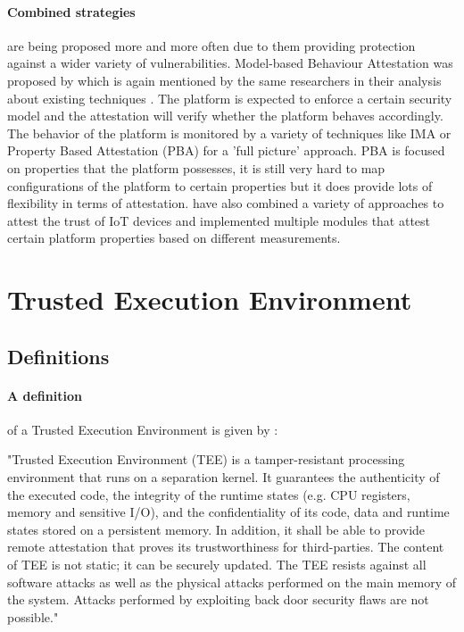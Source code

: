 \paragraph*{Combined strategies}
are being proposed more and more often due to them providing protection against a wider variety of vulnerabilities. Model-based Behaviour Attestation was proposed by \cite{AlamMasoom2008Mba} which is again mentioned by the same researchers in their analysis about existing techniques \cite{AlamMasoom2012Aoer}. The platform is expected to enforce a certain security model and the attestation will verify whether the platform behaves accordingly. The behavior of the platform is monitored by a variety of techniques like IMA or Property Based Attestation (PBA) for a 'full picture' approach. PBA is focused on properties that the platform possesses, it is still very hard to map configurations of the platform to certain properties but it does provide lots of flexibility in terms of attestation. \cite{MuhlbergJanTobias2016LaFT} have also combined a variety of approaches to attest the trust of IoT devices and implemented multiple modules that attest certain platform properties based on different measurements.

\section{Trusted Execution Environment}

\subsection*{Definitions}

\paragraph*{A definition}
of a Trusted Execution Environment is given by \cite{SabtMohamed2015TEEW}: \begin{displayquote} "Trusted Execution Environment (TEE) is a tamper-resistant processing environment that runs on a separation kernel. It guarantees the authenticity of the executed code, the integrity of the runtime states (e.g. CPU registers, memory and sensitive I/O), and the confidentiality of its code, data and runtime states stored on a persistent memory. In addition, it shall be able to provide remote attestation that proves its trustworthiness for third-parties. The content of TEE is not static; it can be securely updated. The TEE resists against all software attacks as well as the physical attacks performed on the main memory of the system. Attacks performed by exploiting back door security flaws are not possible."
\end{displayquote} 

